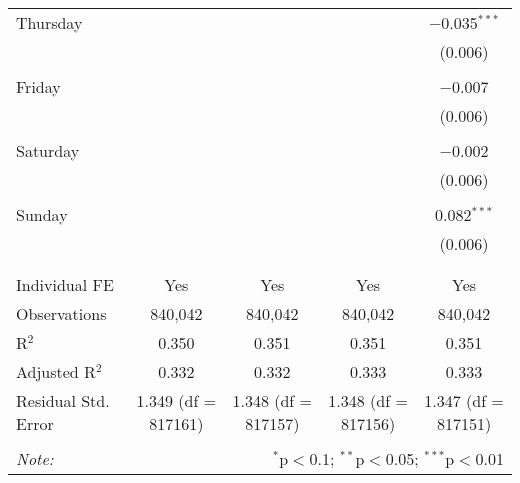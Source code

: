 \documentclass[
]{article}
\begin{document}
\begin{table}[!htbp]
{\begin{tabular}{@{\extracolsep{5pt}}lcccc}
 Thursday &  &  &  & $-$0.035$^{***}$ \\ 
  &  &  &  & (0.006) \\ 
  & & & & \\ 
 Friday &  &  &  & $-$0.007 \\ 
  &  &  &  & (0.006) \\ 
  & & & & \\ 
 Saturday &  &  &  & $-$0.002 \\ 
  &  &  &  & (0.006) \\ 
  & & & & \\ 
 Sunday &  &  &  & 0.082$^{***}$ \\ 
  &  &  &  & (0.006) \\ 
  & & & & \\ 
\hline \\[-1.8ex] 
Individual FE & Yes & Yes & Yes & Yes \\ 
Observations & 840,042 & 840,042 & 840,042 & 840,042 \\ 
R$^{2}$ & 0.350 & 0.351 & 0.351 & 0.351 \\ 
Adjusted R$^{2}$ & 0.332 & 0.332 & 0.333 & 0.333 \\ 
Residual Std. Error & 1.349 (df = 817161) & 1.348 (df = 817157) & 1.348 (df = 817156) & 1.347 (df = 817151) \\ 
\hline 
\hline \\[-1.8ex] 
\textit{Note:}  & \multicolumn{4}{r}{$^{*}$p$<$0.1; $^{**}$p$<$0.05; $^{***}$p$<$0.01} \\ 
\end{tabular}
} 
\end{table} 
\newpage
\end{document}

